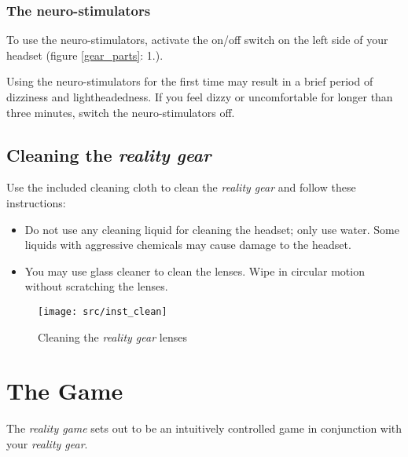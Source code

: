 \subsection{The neuro-stimulators}

To use the neuro-stimulators, activate the on/off switch on the left side of your headset (figure \ref{gear_parts}: 1.). 

Using the neuro-stimulators for the first time may result in a brief period of dizziness and lightheadedness. If you feel dizzy or uncomfortable for longer than three minutes, switch the neuro-stimulators off.

\newpage
\section[Cleaning the \emph{\pokeT{} reality gear}]{Cleaning the \emph{\poke{} reality gear}}

Use the included cleaning cloth to clean the \emph{\poke{} reality gear} and follow these instructions:

\begin{itemize}
\item Do not use any cleaning liquid for cleaning the headset; only use water. Some liquids with aggressive chemicals may cause damage to the headset.
\label{cleaningLenses}
\item You may use glass cleaner to clean the lenses. Wipe in circular motion without scratching the lenses.
\end{itemize}
\begin{figure}[!ht]
\begin{center}
\texttt{[image: src/inst\_clean]}
\end{center}
\caption[Cleaning the \emph{\pokeT{} reality gear} lenses]{Cleaning the \emph{\poke{} reality gear} lenses}
\label{gear_clean}
\end{figure}

\chapter{The Game}

The \emph{\poke{} reality game} sets out to be an intuitively controlled game in conjunction with your \emph{\poke{} reality gear}.


